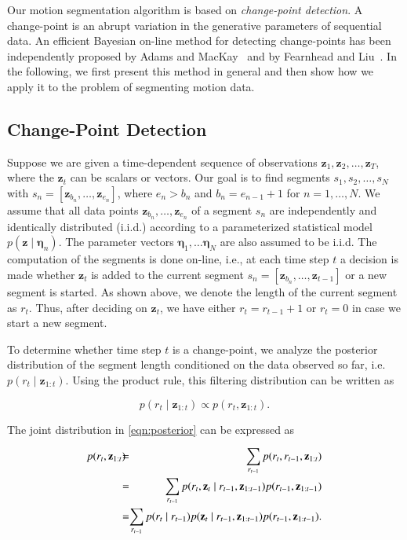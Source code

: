 Our motion segmentation algorithm is based on \emph{change-point detection}. A
change-point is an abrupt variation in the generative parameters of sequential
data. An efficient Bayesian on-line method for detecting change-points has been
independently proposed by Adams and MacKay~\cite{adams07bayesian} and by
Fearnhead and Liu~\cite{fearnhead07online}. In the following, we first present
this method in general and then show how we apply it to the problem of
segmenting motion data.

\subsection{Change-Point Detection}
Suppose we are given a time-dependent sequence of observations $\mathbf{z}_1,
\mathbf{z}_2, \dots,\mathbf{z}_T$, where the $\mathbf{z}_t$ can be scalars or
vectors. Our goal is to find segments $s_1,s_2,\dots,s_N$ with
$s_n=[\mathbf{z}_{b_n},\dots,\mathbf{z}_{e_n}]$, where $e_n > b_n$ and
$b_n = e_{n-1}+1$ for $n=1,\dots,N$. We assume that all data points
$\mathbf{z}_{b_n},\dots,\mathbf{z}_{e_n}$ of a segment $s_n$ are independently
and identically distributed (i.i.d.) according to a parameterized statistical
model \mbox{$p(\mathbf{z}\mid \boldsymbol{\eta}_n)$}. The parameter vectors
$\boldsymbol{\eta}_1,\dots \boldsymbol{\eta}_N$ are also assumed to be i.i.d.
The computation of the segments is done on-line, i.e., at each time step $t$ a
decision is made whether $\mathbf{z}_t$ is added to the current segment
$s_n=[\mathbf{z}_{b_n},\dots,\mathbf{z}_{t-1}]$ or a new segment is started. As
shown above, we denote the length of the current segment as $r_t$. Thus, after
deciding on $\mathbf{z}_t$, we have either $r_t=r_{t-1}+1$ or $r_t=0$ in case we
start a new segment.

To determine whether time step $t$ is a change-point, we analyze the posterior
distribution of the segment length conditioned on the data observed so far,
i.e. $p(r_t\mid \mathbf{z}_{1:t})$. Using the product rule, this filtering
distribution can be written as

\begin{equation}
\label{eqn:posterior}
p(r_t\mid \mathbf{z}_{1:t})\propto p(r_t,\mathbf{z}_{1:t}).
\end{equation}

The joint distribution in \eqref{eqn:posterior} can be expressed as

\begin{eqnarray}
\label{eqn:joint}
p(r_t,\mathbf{z}_{1:t})\hspace{-0.2cm}&=& \hspace{-0.35cm}\sum_{r_{t-1}}p(r_t,
r_{t-1},\mathbf{z}_{1:t})\nonumber\\
&=&\hspace{-0.35cm}\sum_{r_{t-1}}p(r_t,\mathbf{z}_t\mid r_{t-1},
\mathbf{z}_{1:t-1})p(r_{t-1},\mathbf{z}_{1:t-1})\nonumber\\
&=&\hspace{-0.35cm}\sum_{r_{t-1}}p(r_t\mid r_{t-1})p(\mathbf{z}_t\mid r_{t-1},
\mathbf{z}_{1:t-1})p(r_{t-1},\mathbf{z}_{1:t-1}).
\end{eqnarray}

